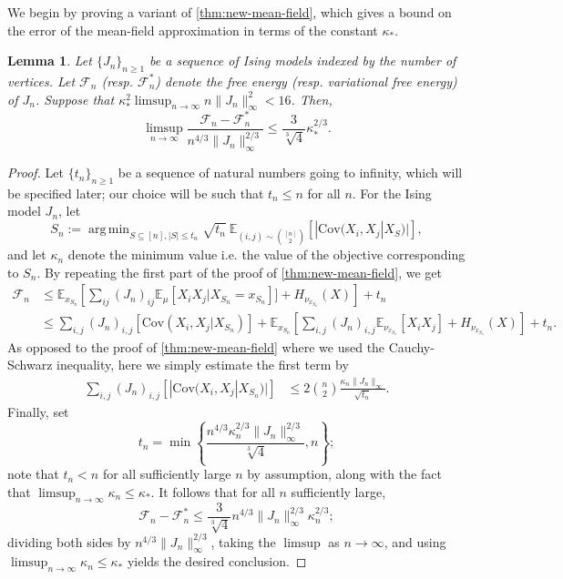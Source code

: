 \documentclass[11pt, oneside, english]{article}
\newcommand{\bE}{\mathbb{E}}
\newcommand{\F}{\mathcal{F}}
\newcommand{\Cov}{\mathrm{Cov}}
\newcommand{\E}{\bE}      %
\DeclareMathOperator*{\argmin}{arg\,min}
\newtheorem{lemma}[theorem]{Lemma}
\theoremstyle{definition}
\theoremstyle{plain}
\begin{document}
We begin by proving a variant of \cref{thm:new-mean-field}, which gives a bound on the error of the mean-field approximation in terms of the constant $\kappa_{*}$. 
\begin{lemma}
\label{lemma:infinity-bound-mean-field}
Let $\{J_n\}_{n\geq 1}$ be a sequence of Ising models indexed by the number of vertices. Let $\F_n$ (resp. $\F^*_n$) denote the free energy (resp. variational free energy) of $J_n$. Suppose that $\kappa_*^{2}\limsup_{n \to \infty}{n\|J_n\|_{\infty}^{2}} < 16$. Then,  
$$\limsup_{n \to \infty}\frac{\F_n - \F_n^*}{n^{4/3}\|J_n\|_{\infty}^{2/3}} \le \frac{3}{\sqrt[3]{4}}\kappa_*^{2/3}.$$
\end{lemma}
\begin{proof}
Let $\{t_n\}_{n\geq 1}$ be a sequence of natural numbers going to infinity, which will be specified later; our choice will be such that $t_n \leq n$ for all $n$. For the Ising model $J_n$, let
$$S_n := \argmin_{S\subseteq[n],|S|\leq t_n}\sqrt{t_n}\ \E_{(i,j) \sim {[n] \choose 2}}[|\Cov(X_i,X_j | X_S)|],$$
and let $\kappa_n$ denote the minimum value i.e. the value of the objective corresponding to $S_n$.  
By repeating the first part of the proof of \cref{thm:new-mean-field}, we get
\begin{align*}
\F_{n} 
&\leq \E_{x_{S_n}}\left[\sum_{ij} (J_n)_{ij}\E_{\mu}[X_i X_j | X_{S_n} = x_{S_n}]] + H_{\nu_{x_{S_n}}}(X)\right] + t_n\\
&\leq \sum_{i,j}(J_n)_{i,j}[\Cov(X_i,X_j|X_{S_n})] + \E_{x_{S_n}}\left[\sum_{i,j}(J_n)_{i,j}\E_{\nu_{x_{S_n}}}[X_iX_j] + H_{\nu_{x_{S_n}}}(X)\right]+t_n.
\end{align*}
As opposed to the proof of \cref{thm:new-mean-field} where we used the Cauchy-Schwarz inequality, here we simply estimate the first term by
\begin{align*}
\sum_{i,j}(J_n)_{i,j}[|\Cov(X_i,X_j|X_{S_n})|]
&\leq 2\binom{n}{2}\frac{\kappa_n \|J_n\|_{\infty}}{\sqrt{t_n}}.
\end{align*}
Finally, set
$$t_n = \min\left\{\frac{n^{4/3}\kappa_{n}^{2/3}\|J_n\|_{\infty}^{2/3}}{\sqrt[3]{4}},n\right\};$$
note that $t_n < n$ for all sufficiently large $n$ by assumption, along with the fact that $\limsup_{n \to \infty}\kappa_{n} \leq \kappa_*$. It follows that for all $n$ sufficiently large,
$$\F_n - \F_n^{*} \leq \frac{3}{\sqrt[3]{4}}n^{4/3}\|J_n\|_{\infty}^{2/3}\kappa_n^{2/3};$$
dividing both sides by $n^{4/3}\|J_n\|_{\infty}^{2/3}$, taking the $\limsup$ as $n \to \infty$, and using $\limsup_{n \to \infty} \kappa_n \leq \kappa_*$ yields the desired conclusion.
\end{proof}
\end{document}
